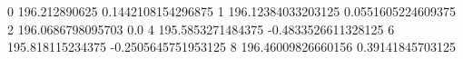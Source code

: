 0 196.212890625 0.1442108154296875
1 196.12384033203125 0.0551605224609375
2 196.0686798095703 0.0
4 195.5853271484375 -0.4833526611328125
6 195.818115234375 -0.2505645751953125
8 196.46009826660156 0.39141845703125
